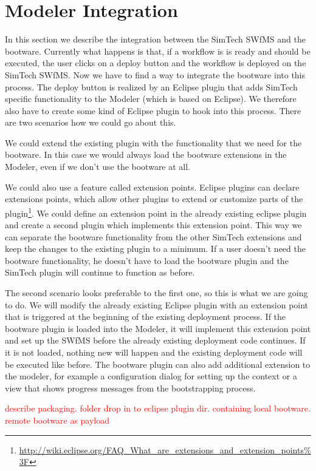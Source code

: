 \section{Modeler Integration}
\label{implementation:modeler_integration}

In this section we describe the integration between the SimTech SWfMS and the bootware.
Currently what happens is that, if a workflow is is ready and should be executed, the user clicks on a deploy button and the workflow is deployed on the SimTech SWfMS.
Now we have to find a way to integrate the bootware into this process.
The deploy button is realized by an Eclipse plugin that adds SimTech specific functionality to the Modeler (which is based on Eclipse).
We therefore also have to create some kind of Eclipse plugin to hook into this process.
There are two scenarios how we could go about this.

We could extend the existing plugin with the functionality that we need for the bootware.
In this case we would always load the bootware extensions in the Modeler, even if we don't use the bootware at all.

We could also use a feature called extension points.
Eclipse plugins can declare extensions points, which allow other plugins to extend or customize parts of the plugin\footnote{\url{http://wiki.eclipse.org/FAQ_What_are_extensions_and_extension_points\%3F}}.
We could define an extension point in the already existing eclipse plugin and create a second plugin which implements this extension point.
This way we can separate the bootware functionality from the other SimTech extensions and keep the changes to the existing plugin to a minimum.
If a user doesn't need the bootware functionality, he doesn't have to load the bootware plugin and the SimTech plugin will continue to function as before.

The second scenario looks preferable to the first one, so this is what we are going to do.
We will modify the already existing Eclipse plugin with an extension point that is triggered at the beginning of the existing deployment process.
If the bootware plugin is loaded into the Modeler, it will implement this extension point and set up the SWfMS before the already existing deployment code continues.
If it is not loaded, nothing new will happen and the existing deployment code will be executed like before.
The bootware plugin can also add additional extension to the modeler, for example a configuration dialog for setting up the context or a view that shows progress messages from the bootstrapping process.

\textcolor{red}{describe packaging. folder drop in to eclipse plugin dir. containing local bootware. remote bootware as payload}

